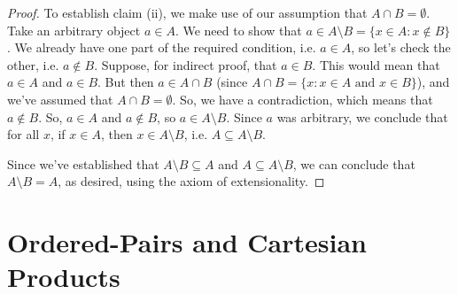 \begin{enumerate}[\thesection.1]
\begin{proof}
To establish claim (ii), we make use of our assumption that $A\cap B=\emptyset$. Take an arbitrary object $a\in A$. We need to show that $a\in A\setminus B=\{x\in A: x\notin B\}$. We already have one part of the required condition, i.e. $a\in A$, so let's check the other, i.e. $a\notin B$. Suppose, for indirect proof, that $a\in B$. This would mean that $a\in A$ and $a\in B$. But then $a\in A\cap B$ (since $A\cap B=\{x:x\in A\text{ and }x\in B\}$), and we've assumed that $A\cap B=\emptyset$. So, we have a contradiction, which means that $a\notin B$. So, $a\in A$ and $a\notin B$, so $a\in A\setminus B$. Since $a$ was arbitrary, we conclude that for all $x$, if $x\in A$, then $x\in A\setminus B$, i.e. $A\subseteq A\setminus B$.

Since we've established that $A\setminus B\subseteq A$ and $A\subseteq A\setminus B$, we can conclude that $A\setminus B=A$, as desired, using the axiom of extensionality.
\end{proof}




\end{enumerate}


\section{Ordered-Pairs and Cartesian Products}

